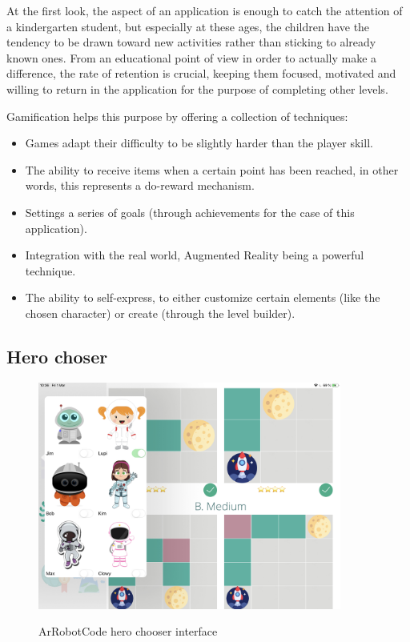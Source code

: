 \documentclass[12 pct]{report}
\begin{document}
At the first look, the aspect of an application is enough to catch the attention of a kindergarten student, but especially at these ages, the children have the tendency to be drawn toward new activities rather than sticking to already known ones.
From an educational point of view in order to actually make a difference, the rate of retention is crucial, keeping them focused, motivated and willing to return in the application for the purpose of completing other levels.

Gamification helps this purpose by offering a collection of techniques:

\begin{itemize}
\item Games adapt their difficulty to be slightly harder than the player skill.
\item The ability to receive items when a certain point has been reached, in other words, this represents a do-reward mechanism.
\item Settings a series of goals (through achievements for the case of this application).
\item Integration with the real world, Augmented Reality being a powerful technique.
\item The ability to self-express, to either customize certain elements (like the chosen character) or create (through the level builder).
\end{itemize}

\subsection*{Hero choser}
\begin{figure}[H]
\includegraphics[width=0.89\textwidth]{ArRobotCode1}
\centering
\label{fig:feature-points}
\caption{ArRobotCode hero chooser interface}
\end{figure}
\end{document}
